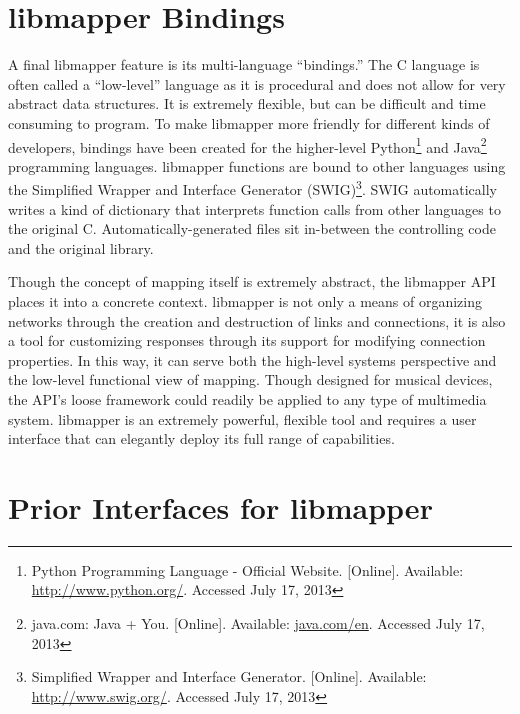 	\section{libmapper Bindings} %
	\label{sec:libmapper_bindings}

A final libmapper feature is its multi-language ``bindings.'' The C language is often called a ``low-level'' language as it is procedural and does not allow for very abstract data structures. It is extremely flexible, but can be difficult and time consuming to program. To make libmapper more friendly for different kinds of developers, bindings have been created for the higher-level 
Python\footnote{Python Programming Language - Official Website. [Online]. Available: \url{http://www.python.org/}. Accessed July 17, 2013} and Java\footnote{java.com: Java + You. [Online]. Available: \url{java.com/en}. Accessed July 17, 2013} 
programming languages. libmapper functions are bound to other languages using the 
Simplified Wrapper and Interface Generator (SWIG)\footnote{Simplified Wrapper and Interface Generator. [Online]. Available: \url{http://www.swig.org/}. Accessed July 17, 2013}.
SWIG automatically writes a kind of dictionary that interprets function calls from other languages to the original C. Automatically-generated files sit in-between the controlling code and the original library. 

Though the concept of mapping itself is extremely abstract, the libmapper API places it into a concrete context. libmapper is not only a means of organizing networks through the creation and destruction of links and connections, it is also a tool for customizing responses through its support for modifying connection properties. In this way, it can serve both the high-level systems perspective and the low-level functional view of mapping. Though designed for musical devices, the API's loose framework could readily be applied to any type of multimedia system. libmapper is an extremely powerful, flexible tool and requires a user interface that can elegantly deploy its full range of capabilities.


\section{Prior Interfaces for libmapper} %
\label{sec:prior_interfaces_for_libmapper}

